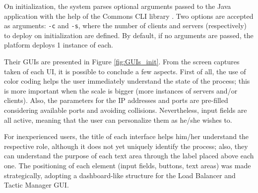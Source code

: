 \documentclass[12pt]{article}
\begin{document}
On initialization, the system parses optional arguments passed to the Java application with the help of the Commons CLI library \cite{commonscli}.
Two options are accepted as arguments: \texttt{-c} and \texttt{-s}, where the number of clients and servers (respectively) to deploy on initialization are defined.
By default, if no arguments are passed, the platform deploys 1 instance of each.

Their GUIs are presented in Figure \ref{fig:GUIs_init}.
From the screen captures taken of each UI, it is possible to conclude a few aspects.
First of all, the use of color coding helps the user immediately understand the state of the process; this is more important when the scale is bigger (more 
instances of servers and/or clients).
Also, the parameters for the IP addresses and ports are pre-filled considering available ports and avoiding collisions.
Nevertheless, input fields are all active, meaning that the user can personalize them as he/she wishes to.

For inexperienced users, the title of each interface helps him/her understand the respective role, although it does not yet uniquely identify the process;
also, they can understand the purpose of each text area through the label placed above each one.
The positioning of each element (input fields, buttons, text areas) was made strategically, adopting a dashboard-like structure for the Load Balancer and 
Tactic Manager GUI.
\end{document}
